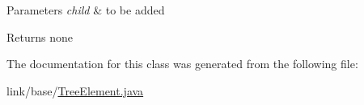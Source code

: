 \begin{DoxyParams}{Parameters}
{\em child} & to be added\\
\hline
\end{DoxyParams}
\begin{DoxyReturn}{Returns}
none 
\end{DoxyReturn}


The documentation for this class was generated from the following file\+:\begin{DoxyCompactItemize}
\item 
link/base/\hyperlink{_tree_element_8java}{Tree\+Element.\+java}\end{DoxyCompactItemize}
